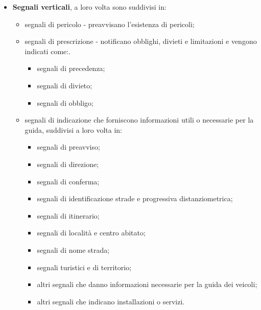 \begin{itemize}
\begin{itemize}
	      \end{itemize}
	\item \textbf{Segnali verticali}, a loro volta sono suddivisi in:
	      \begin{itemize}
	      	\item segnali di pericolo - preavvisano l'esistenza di pericoli;
	      	\item segnali di prescrizione - notificano obblighi, divieti e limitazioni e vengono indicati come:.
	      	      \begin{itemize}
	      	      	\item segnali di precedenza;
	      	      	\item segnali di divieto;
	      	      	\item segnali di obbligo;
	      	      \end{itemize}
	      	\item segnali di indicazione che forniscono informazioni utili o necessarie per la guida, suddivisi a loro volta in:
	      	      \begin{itemize}
	      	      	\item segnali di preavviso;
	      	      	\item segnali di direzione;
	      	      	\item segnali di conferma;
	      	      	\item segnali di identificazione strade e progressiva distanziometrica;
	      	      	\item segnali di itinerario;
	      	      	\item segnali di località e centro abitato;
	      	      	\item segnali di nome strada;
	      	      	\item segnali turistici e di territorio;
	      	      	\item altri segnali che danno informazioni necessarie per la guida dei veicoli;
	      	      	\item altri segnali che indicano installazioni o servizi.
	      	      	      
	      	      \end{itemize}\end{itemize}
	      	      

\end{itemize}

